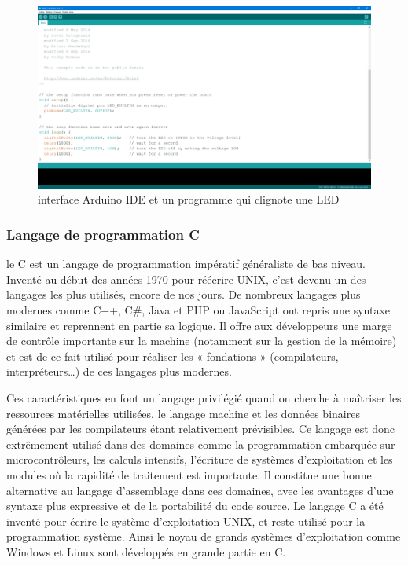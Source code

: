     \begin{figure}[h!]
        \centering
        \includegraphics[scale=0.3]{images/arduino_ide.PNG}
        \caption{interface Arduino IDE et un programme qui clignote une LED}
        \label{fig61}
    \end{figure}
                
                
\subsubsection{Langage de programmation C}
le C est un langage de programmation impératif généraliste de bas niveau. Inventé 
au début des années 1970 pour réécrire UNIX, c’est devenu un des langages les 
plus utilisés, encore de nos jours. De nombreux langages plus modernes comme 
C++, C#, Java et PHP ou JavaScript ont repris une syntaxe similaire et 
reprennent en partie sa logique. Il offre aux développeurs une marge de contrôle 
importante sur la machine (notamment sur la gestion de la mémoire) et est de ce 
fait utilisé pour réaliser les « fondations » (compilateurs, interpréteurs…) de 
ces langages plus modernes.

Ces caractéristiques en font un langage privilégié quand on cherche à maîtriser 
les ressources matérielles utilisées, le langage machine et les données binaires 
générées par les compilateurs étant relativement prévisibles. Ce langage est 
donc extrêmement utilisé dans des domaines comme la programmation embarquée sur 
microcontrôleurs, les calculs intensifs, l’écriture de systèmes d’exploitation 
et les modules où la rapidité de traitement est importante. Il constitue une 
bonne alternative au langage d’assemblage dans ces domaines, avec les avantages 
d’une syntaxe plus expressive et de la portabilité du code source. Le langage C 
a été inventé pour écrire le système d’exploitation UNIX, et reste utilisé pour 
la programmation système. Ainsi le noyau de grands systèmes d’exploitation comme 
Windows et Linux sont développés en grande partie en C.
                
